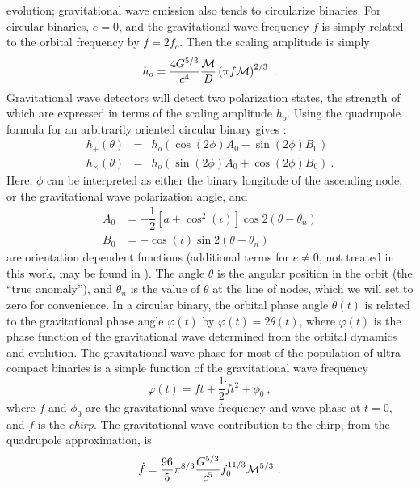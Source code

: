 \documentclass[preprint2]{aastex}
\begin{document}
evolution; gravitational wave emission also tends to circularize
binaries.  For circular binaries, $e = 0$, and the gravitational wave
frequency $f$ is simply related to the orbital frequency by $f = 2
f_{o}$.  Then the scaling amplitude is simply
\begin{equation}
	h_{o} = \frac{4G^{5/3}}{c^{4}}\frac{{\cal M}}{D}\left(
	\pi f {\cal M}\right)^{2/3} \ .
    \label{eqn.scalingAmplitude2}
\end{equation}
Gravitational wave detectors will detect two polarization states, the 
strength of which are expressed in terms of the scaling amplitude 
$h_{o}$. Using the quadrupole formula for an arbitrarily oriented 
circular binary gives \citep{1987GReGr..19.1101W}:
\begin{eqnarray}
   h_{+}(\theta) &=& h_{o}(\cos(2\phi)A_0 - \sin(2\phi)B_0 ) 
   \nonumber \\
   h_{\times}(\theta) &=& h_{o}( \sin(2\phi)A_0 +\cos(2\phi)B_0 ) \ .
   \label{eqn.wahlquistPolarization}
\end{eqnarray}
Here, $\phi$ can be interpreted as either the binary longitude of the
ascending node, or the gravitational wave polarization angle, and
\begin{align}
   A_0 &= -\dfrac{1}{2}[a+\cos^2(\iota)]\cos 2(\theta-\theta_n)\\
   B_0 &= -\cos(\iota)\sin 2(\theta-\theta_n)
\end{align}
are orientation dependent functions (additional terms for $e \neq 0$,
not treated in this work, may be found in
\citet{1987GReGr..19.1101W}).  The angle $\theta$ is the angular
position in the orbit (the ``true anomaly''), and $\theta_n$ is the
value of $\theta$ at the line of nodes, which we will set to zero for
convenience.  In a circular binary, the orbital phase angle
$\theta(t)$ is related to the gravitational phase angle $\varphi(t)$
by $\varphi(t) = 2\theta(t)$, where $\varphi(t)$ is the phase function
of the gravitational wave determined from the orbital dynamics and
evolution.  The gravitational wave phase for most of the population of
ultra-compact binaries is a simple function of the gravitational wave
frequency
\begin{equation}
    \varphi(t) = f t + \frac{1}{2}{\dot f} t^{2} + \phi_{0}\ ,
	\label{eqn.chirp}
\end{equation}
where $f$ and $\phi_{0}$ are the gravitational wave frequency and
wave phase at $t = 0$, and ${\dot f}$ is the \textit{chirp}.  The
gravitational wave contribution to the chirp, from the quadrupole
approximation, is
\begin{equation}
	{\dot f} =
	\frac{96}{5}\pi^{8/3}\frac{G^{5/3}}{c^{5}}f_{0}^{11/3}{\cal
	M}^{5/3}\ .
    \label{eqn.gwChirp}
\end{equation}
\end{document}
